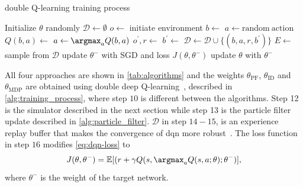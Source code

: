 \begin{algorithm}[!t]
    \caption{double Q-learning training process}\label{alg:training_process}
    \begin{algorithmic}[1]
        \State Initialize $\theta$ randomly
        \State $\mathcal{D} \gets \emptyset$
            \State $o \gets $ initiate environment
            \Comment{\eqref{eq:observation}}
            \State $b \gets $ 
                    \State $a \gets \mathrm{random\ action}$
                \Else
                    \State $Q(b, a) \gets $
                    \State $a \gets \argmax_{a} Q(b,a)$
                    \Comment{\eqref{eq:optimal_policy}}
                \EndIf
                \State $o^\prime, r \gets $ 
                \State $b^\prime \gets $ 
                \State $\mathcal{D} \gets \mathcal{D} \cup \{(b, a, r, b^\prime)\}$
                \State $E \gets $ sample from $\mathcal{D}$
                \State update $\theta^-$ with SGD and loss $J(\theta,\theta^-)$ 
                \Comment{\eqref{eq:ddqn-loss}}
                    \State update $\theta$ with $\theta^-$
                \EndFor
            \EndWhile
        \EndFor
    \end{algorithmic}
\end{algorithm}

All four approaches are shown in \ref{tab:algorithms} and the weights $\theta_\mathrm{PF}$, $\theta_\mathrm{ID}$ and $\theta_\mathrm{MDP}$ are obtained using double deep Q-learning~\cite{Hasselt2016ddqn}, described in \ref{alg:training_process}, where step $10$ is different between the algorithms. Step 12 is the simulator described in the next section while step 13 is the particle filter update described in \ref{alg:particle_filter}. $\mathcal{D}$ in step $14-15$, is an experience replay buffer that makes the convergence of \gls{dqn} more robust~\cite{Mnih2015}.
The loss function in step $16$ modifies \eqref{eq:dqn-loss} to
\begin{equation}
    J(\theta,\theta^-) = \mathbb{E}[(r + \gamma Q(s,\argmax_{a} Q(s,a;\theta);\theta^-)],
    \label{eq:ddqn-loss}
\end{equation}
where $\theta^-$ is the weight of the target network. 

